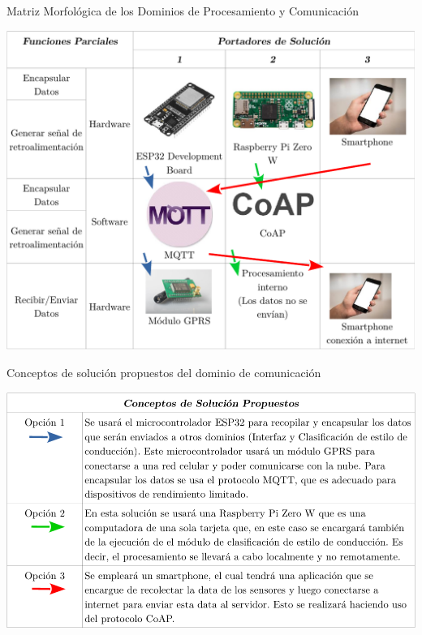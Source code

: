 \begin{table}[htbp!]
  \caption{Matriz Morfológica de los Dominios de Procesamiento y Comunicación}
  \label{diag:morf_com}
  \centering
  \includegraphics[width=0.9\linewidth]{morf_com.pdf}
\end{table}

\begin{table}[htbp!]
  \caption{Conceptos de solución propuestos del dominio de comunicación}
  \label{diag:sol_com}
  \includegraphics[width=\linewidth]{sol_com.pdf}
\end{table}

